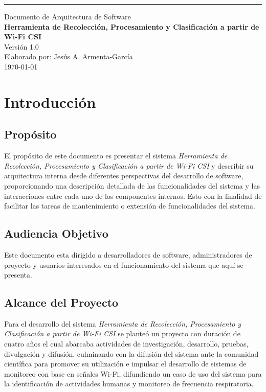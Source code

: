 \documentclass{scrreprt}
\date{}
\def\myversion{1.0 }
\begin{document}
\begin{flushright}
    \rule{16cm}{5pt}\vskip1cm
    \begin{bfseries}
        \Huge{Documento de Arquitectura de Software}\\
        \vspace{1.5cm}
        \textbf{Herramienta de Recolección, Procesamiento y Clasificación a partir de Wi-Fi CSI}\\
        \vspace{1.5cm}
        \LARGE{Versión \myversion}\\
        \vspace{1.5cm}
        Elaborado por: Jesús A. Armenta-García\\
        \vspace{1.5cm}
        \today\\
    \end{bfseries}
\end{flushright}

\tableofcontents

\chapter{Introducción}

\section{Propósito}
El propósito de este documento es presentar el sistema \emph{Herramienta de Recolección, Procesamiento y Clasificación a partir de Wi-Fi CSI} y describir su arquitectura interna desde diferentes perspectivas del desarrollo de software, proporcionando una descripción detallada de las funcionalidades del sistema y las interacciones entre cada uno de los componentes internos. Esto con la finalidad de facilitar las tareas de mantenimiento o extensión de funcionalidades del sistema. 

\section{Audiencia Objetivo}
Este documento esta dirigido a desarrolladores de software, administradores de proyecto y usuarios interesados en el funcionamiento del sistema que aquí se presenta. 

\section{Alcance del Proyecto}
Para el desarrollo del sistema \emph{Herramienta de Recolección, Procesamiento y Clasificación a partir de Wi-Fi CSI} se planteó un proyecto con duración de cuatro años el cual abarcaba actividades de investigación, desarrollo, pruebas, divulgación y difusión, culminando con la difusión del sistema ante la comunidad científica para promover su utilización e impulsar el desarrollo de sistemas de monitoreo con base en señales Wi-Fi, difundiendo un caso de uso del sistema para la identificación de actividades humanas y monitoreo de frecuencia respiratoria. 
\end{document}
